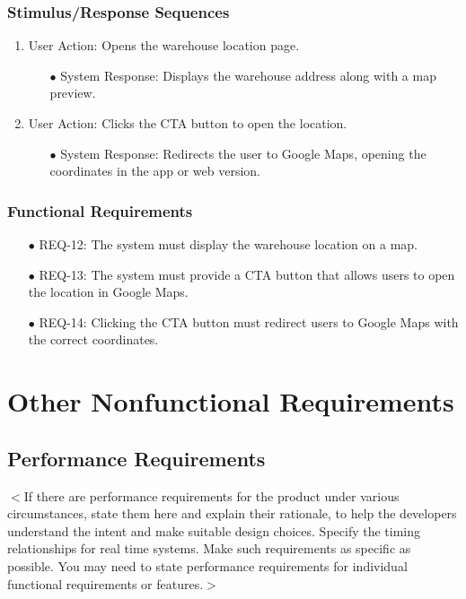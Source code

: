 \documentclass[oneside,a4paper,12pt,explicit]{book}
\begin{document}
\subsection{Stimulus/Response Sequences}
\begin{enumerate}
    \item User Action: Opens the warehouse location page.
    \begin{enumerate}
        \item[$\bullet$] System Response: Displays the warehouse address along with a map preview.
    \end{enumerate}
    \item User Action: Clicks the CTA button to open the location.
    \begin{enumerate}
        \item[$\bullet$] System Response: Redirects the user to Google Maps, opening the coordinates in the app or web version.
    \end{enumerate}
\end{enumerate}

\subsection{Functional Requirements}
\begin{enumerate}
    \item[$\bullet$] REQ-12: The system must display the warehouse location on a map.
    \item[$\bullet$] REQ-13: The system must provide a CTA button that allows users to open the location in Google Maps.
    \item[$\bullet$] REQ-14: Clicking the CTA button must redirect users to Google Maps with the correct coordinates.
\end{enumerate}




\chapter{Other Nonfunctional Requirements}

\section{Performance Requirements}
$<$If there are performance requirements for the product under various 
circumstances, state them here and explain their rationale, to help the 
developers understand the intent and make suitable design choices. Specify the 
timing relationships for real time systems. Make such requirements as specific 
as possible. You may need to state performance requirements for individual 
functional requirements or features.$>$
\end{document}
